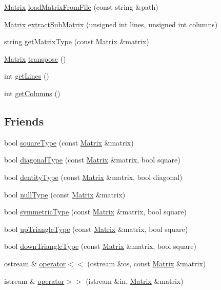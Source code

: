 \begin{DoxyCompactItemize}
\hyperlink{class_matrix}{Matrix} \hyperlink{class_matrix_aeef502e91c5f815b9a99525c0c55f741}{load\-Matrix\-From\-File} (const string \&path)
\item 
\hyperlink{class_matrix}{Matrix} \hyperlink{class_matrix_aeaa460b51a3e8ba810c4caa86427429b}{extract\-Sub\-Matrix} (unsigned int lines, unsigned int columns)
\item 
string \hyperlink{class_matrix_a0a730222578ce4b86e2166dfe8d402d2}{get\-Matrix\-Type} (const \hyperlink{class_matrix}{Matrix} \&matrix)
\item 
\hyperlink{class_matrix}{Matrix} \hyperlink{class_matrix_ae23f817021383e3c8636a714dcba1d21}{transpose} ()
\item 
int \hyperlink{class_matrix_acc315708bcdb54795a686b91277f5bdf}{get\-Lines} ()
\item 
int \hyperlink{class_matrix_a324b4057cd6e2167687e406abd720020}{get\-Columns} ()
\end{DoxyCompactItemize}
\subsection*{Friends}
\begin{DoxyCompactItemize}
\item 
bool \hyperlink{class_matrix_ac308d2d0cd1651df117cd293f4a062ec}{square\-Type} (const \hyperlink{class_matrix}{Matrix} \&matrix)
\item 
bool \hyperlink{class_matrix_a8f168d2d101b11060ff7665b718dbd00}{diagonal\-Type} (const \hyperlink{class_matrix}{Matrix} \&matrix, bool square)
\item 
bool \hyperlink{class_matrix_a0fe53702f523992357b0045647d86add}{dentity\-Type} (const \hyperlink{class_matrix}{Matrix} \&matrix, bool diagonal)
\item 
bool \hyperlink{class_matrix_ad324d8057612009e306716ff6f944d8d}{null\-Type} (const \hyperlink{class_matrix}{Matrix} \&matrix)
\item 
bool \hyperlink{class_matrix_a6952b686de4d766d5e6071ea05ce1e5e}{symmetric\-Type} (const \hyperlink{class_matrix}{Matrix} \&matrix, bool square)
\item 
bool \hyperlink{class_matrix_add887b389e9c6a532fd0de569ded15e1}{up\-Triangle\-Type} (const \hyperlink{class_matrix}{Matrix} \&matrix, bool square)
\item 
bool \hyperlink{class_matrix_a9bca4cd9ce5dbee1a08831254b359093}{down\-Triangle\-Type} (const \hyperlink{class_matrix}{Matrix} \&matrix, bool square)
\item 
ostream \& \hyperlink{class_matrix_a85a2865bcc2b7c641162bbd4aa13a7c6}{operator$<$$<$} (ostream \&os, const \hyperlink{class_matrix}{Matrix} \&matrix)
\item 
istream \& \hyperlink{class_matrix_a65e4cbf2651c384b15830e97747feebc}{operator$>$$>$} (istream \&in, \hyperlink{class_matrix}{Matrix} \&matrix)
\end{DoxyCompactItemize}


